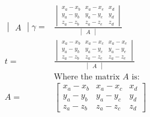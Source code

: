 \documentclass[a4paper, 12pt]{article}
\begin{document}
\begin{enumerate}
\begin{align*}
{\begin{vmatrix}
            A
        \end{vmatrix}
        }
        \gamma =&
        \frac{
        \begin{vmatrix}
            x_a-x_b & x_a - x_e & x_d \\
            y_a-y_b & y_a - y_e & y_d \\
            z_a-z_b & z_a - z_e & z_d
        \end{vmatrix}
        }{
        \begin{vmatrix}
            A
        \end{vmatrix}
        }\\
        t =&
        \frac{
        \begin{vmatrix}
            x_a-x_b & x_a - x_c & x_a - x_e \\
            y_a-y_b & y_a - y_c & y_a - y_e \\
            z_a-z_b & z_a - z_c & z_a - z_e
        \end{vmatrix}
        }{
        \begin{vmatrix}
            A
        \end{vmatrix}
        }\\
        &\text{Where the matrix $A$ is:}\\
        A =&\begin{bmatrix}
            x_a-x_b & x_a - x_c & x_d \\
            y_a-y_b & y_a - y_c & y_d \\
            z_a-z_b & z_a - z_c & z_d
        \end{bmatrix}\\
    \end{align*}


\end{enumerate}
\end{document}
